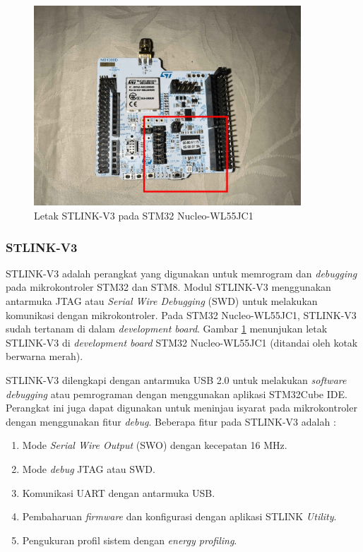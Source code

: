 \begin{figure}[H]
	\centering
	\includegraphics[width=10cm]{contents/chapter-2/stlink-in-wl55.jpg}
	\caption{Letak STLINK-V3 pada STM32 Nucleo-WL55JC1}
	\label{Fig: stlink-in-wl55}
\end{figure}

\subsubsection{STLINK-V3}
STLINK-V3 adalah perangkat yang digunakan untuk memrogram dan \textit{debugging} pada mikrokontroler STM32 dan STM8. Modul STLINK-V3 menggunakan antarmuka JTAG atau \textit{Serial Wire Debugging} (SWD) untuk melakukan komunikasi dengan mikrokontroler. Pada STM32 Nucleo-WL55JC1, STLINK-V3 sudah tertanam di dalam \textit{development board}. Gambar \ref{Fig: stlink-in-wl55} menunjukan letak STLINK-V3 di \textit{development board} STM32 Nucleo-WL55JC1 (ditandai oleh kotak berwarna merah).

STLINK-V3 dilengkapi dengan antarmuka USB 2.0 untuk melakukan \textit{software debugging} atau pemrograman dengan menggunakan aplikasi STM32Cube IDE. Perangkat ini juga dapat digunakan untuk meninjau isyarat pada mikrokontroler dengan menggunakan fitur \textit{debug}. Beberapa fitur pada STLINK-V3 adalah \cite{STMicroelectronics2023a}:

\begin{enumerate}
	\item Mode \textit{Serial Wire Output} (SWO) dengan kecepatan 16 MHz.
	\item Mode \textit{debug} JTAG atau SWD.
	\item Komunikasi UART dengan antarmuka USB.
	\item Pembaharuan \textit{firmware} dan konfigurasi dengan aplikasi STLINK \textit{Utility}.
	\item Pengukuran profil sistem dengan \textit{energy profiling}.
\end{enumerate}

